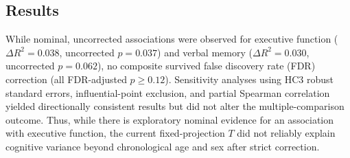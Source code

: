 \documentclass[journal]{IEEEtran}
\begin{document}
\subsection{Results}
While nominal, uncorrected associations were observed for executive function ($\Delta R^2 = 0.038$, uncorrected $p = 0.037$) and verbal memory ($\Delta R^2 = 0.030$, uncorrected $p = 0.062$), no composite survived false discovery rate (FDR) correction (all FDR-adjusted $p \ge 0.12$). Sensitivity analyses using HC3 robust standard errors, influential-point exclusion, and partial Spearman correlation yielded directionally consistent results but did not alter the multiple-comparison outcome. Thus, while there is exploratory nominal evidence for an association with executive function, the current fixed-projection $T$ did not reliably explain cognitive variance beyond chronological age and sex after strict correction.
\end{document}
